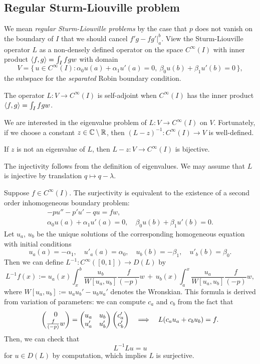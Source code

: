 \documentclass[a4paper]{article}
\begin{document}
\subsection{Regular Sturm-Liouville problem}
We mean \emph{regular Sturm-Liouville problems} by the case that $p$ does not vanish on the boundary of $I$ that we should cancel $f'g-fg'|_a^b$.
View the Sturm-Liouville operator $L$ as a non-densely defined operator on the space $C^\infty(I)$ with inner product $\langle f,g\rangle=\int_Ifgw$ with domain
\[V=\{\,u\in C^\infty(I):\alpha_0u(a)+\alpha_1u'(a)=0,\ \beta_0u(b)+\beta_1u'(b)=0\,\},\]
the subspace for the \emph{separated} Robin boundary condition.
\begin{prop}
The operator $L:V\to C^\infty(I)$ is self-adjoint when $C^\infty(I)$ has the inner product $\langle f,g\rangle=\int_Ifgw$.
\end{prop}
We are interested in the eigenvalue problem of $L:V\to C^\infty(I)$ on $V$.
Fortunately, if we choose a constant $z\in\mathbb{C}\setminus\mathbb{R}$, then $(L-z)^{-1}:C^\infty(I)\to V$ is well-defined.
\begin{prop}
If $z$ is not an eigenvalue of $L$, then $L-z:V\to C^\infty(I)$ is bijective.
\end{prop}
\begin{pf}
The injectivity follows from the definition of eigenvalues.
We may assume that $L$ is injective by translation $q\mapsto q-\lambda$.

Suppose $f\in C^\infty(I)$.
The surjectivity is equivalent to the existence of a second order inhomogeneous boundary problem:
\begin{gather*}
-pu''-p'u'-qu=fw,\\
\alpha_0u(a)+\alpha_1u'(a)=0,\quad\beta_0u(b)+\beta_1u'(b)=0.
\end{gather*}
Let $u_a$, $u_b$ be the unique solutions of the corresponding homogeneous equation with initial conditions
\[u_a(a)=-\alpha_1,\quad u'_a(a)=\alpha_0,\quad u_b(b)=-\beta_1,\quad u'_b(b)=\beta_0.\]
Then we can define $L^{-1}:C^\infty([0,1])\to D(L)$ by
\[L^{-1}f(x):=u_a(x)\int_x^b\frac{u_b}{W[u_a,u_b]}\frac f{(-p)}w\,+\,u_b(x)\int_a^x\frac{u_a}{W[u_a,u_b]}\frac f{(-p)}w,\]
where $W[u_a,u_b]:=u_au_b'-u_bu_a'$ denotes the Wronskian.
This formula is derived from variation of parameters: we can compute $c_a$ and $c_b$ from the fact that
\[\begin{pmatrix}0\\\frac f{(-p)}w\end{pmatrix}=\begin{pmatrix}u_a&u_b\\u_a'&u_b'\end{pmatrix}\begin{pmatrix}c_a'\\c_b'\end{pmatrix}\impl L(c_au_a+c_bu_b)=f.\]
Then, we can check that
\[L^{-1}Lu=u\]
for $u\in D(L)$ by computation, which implies $L$ is surjective.
\end{pf}
\end{document}
